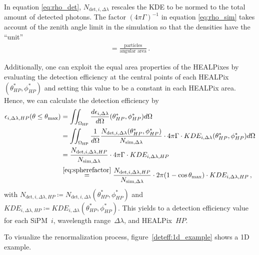 In equation \eqref{eq:rho_det}, $N_{\text{det},i,\Delta\lambda}$ rescales the KDE to be normed to the total amount of detected photons. The factor $(4\pi\Gamma)^{-1}$ in equation \eqref{eq:rho_sim} takes account of the zenith angle limit in the simulation so that the densities have the \enquote{unit}
\begin{align}
	[\rho] = \frac{\text{particles}}{\text{angular area}}\,.
\end{align}

Additionally, one can exploit the equal area properties of the HEALPixes by evaluating the detection efficiency at the central points of each HEALPix $(\theta^\ast_{HP},\phi^\ast_{HP})$ and setting this value to be a constant in each HEALPix area. Hence, we can calculate the detection efficiency by
\begin{align}
	\epsilon_{i,\Delta\lambda,HP}(\theta\leq\theta_\text{max}) &= \iint_{\Omega_\text{HP}}  \frac{d\epsilon_{i,\Delta\lambda}}{d\Omega}(\theta^\ast_{HP},\phi^\ast_{HP}) d\Omega\nonumber\\
	&= \iint_{\Omega_\text{HP}}\frac{1}{d\Omega}\frac{N_{\text{det},i,\Delta\lambda}(\theta^\ast_{HP},\phi^\ast_{HP})}{N_{\text{sim},\Delta\lambda}}\cdot 4\pi\Gamma\cdot KDE_{i,\Delta\lambda}(\theta^\ast_{HP},\phi^\ast_{HP})d\Omega\nonumber\\
	&= \frac{N_{\text{det},i,\Delta\lambda,HP}}{N_{\text{sim},\Delta\lambda}}\cdot 4\pi\Gamma\cdot KDE_{i,\Delta\lambda,HP}\nonumber\\
	&\overset{\eqref{eq:spherefactor}}{=} \frac{N_{\text{det},i,\Delta\lambda,HP}}{N_{\text{sim},\Delta\lambda}}\cdot 2\pi(1-\cos\theta_\text{max})\cdot KDE_{i,\Delta\lambda,HP}\,,
	\label{eq:deteff}
\end{align}
with $N_{\text{det},i,\Delta\lambda,HP}\coloneqq N_{\text{det},i,\Delta\lambda}(\theta^\ast_{HP},\phi^\ast_{HP})$ and $KDE_{i,\Delta\lambda,HP}\coloneqq KDE_{i,\Delta\lambda}(\theta^\ast_{HP},\phi^\ast_{HP})$. This yields to a detection efficiency value for each SiPM~$i$, wavelength range~$\Delta\lambda$, and HEALPix~$HP$.

To visualize the renormalization process, figure~\ref{deteff:1d_example} shows a 1D example.

